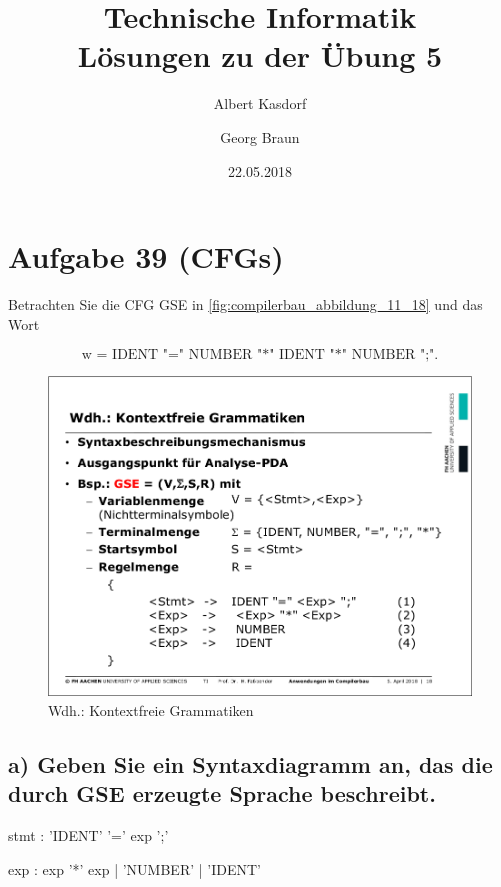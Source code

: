 \documentclass{article}
\title{Technische Informatik\\ Lösungen zu der Übung 5}
\author{
	Albert Kasdorf\and
	Georg Braun
}
\date{22.05.2018}
\begin{document}
\maketitle

\section*{Aufgabe 39 (CFGs)}
Betrachten Sie die CFG GSE in \autoref{fig:compilerbau_abbildung_11_18} und das Wort

\begin{equation*}
	\text{w = IDENT "=" NUMBER "*" IDENT "*" NUMBER ";".}
\end{equation*}

\begin{figure}[h]
	\centering
	\includegraphics[width=0.75\linewidth]{Compilerbau_Abbildung_11_18}
	\caption{Wdh.: Kontextfreie Grammatiken}
	\label{fig:compilerbau_abbildung_11_18}
\end{figure}

\newpage
\subsection*{a) Geben Sie ein Syntaxdiagramm an, das die durch GSE erzeugte Sprache beschreibt.}

\begin{rail}
	stmt : 'IDENT' '=' exp ';'
\end{rail}

\begin{rail}
	exp : exp '*' exp | 'NUMBER' | 'IDENT'
\end{rail}
\end{document}

